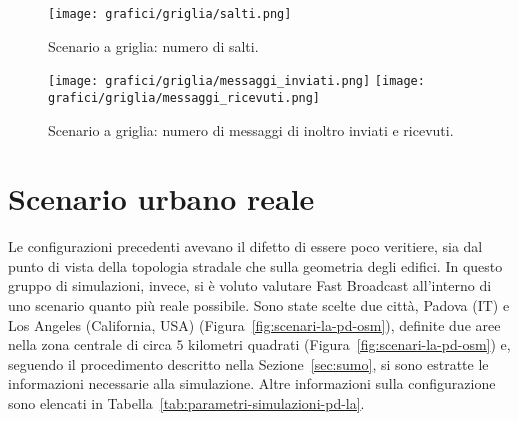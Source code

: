 %
\begin{figure}[htbp]
	\centering
		\texttt{[image: grafici/griglia/salti.png]}
\caption{Scenario a griglia: numero di salti.\label{fig:risultati-griglia-salti}}
\end{figure}
%
\begin{figure}[htbp]
	\centering
		\texttt{[image: grafici/griglia/messaggi\_inviati.png]}
		\texttt{[image: grafici/griglia/messaggi\_ricevuti.png]}
\caption{Scenario a griglia: numero di messaggi di inoltro inviati e ricevuti.\label{fig:risultati-griglia-messaggi}}
\end{figure}
%
%
\section{Scenario urbano reale} %
Le configurazioni precedenti avevano il difetto di essere poco veritiere, sia dal punto di vista della topologia stradale
che sulla geometria degli edifici.
In questo gruppo di simulazioni, invece, si è voluto valutare Fast Broadcast all'interno di uno scenario quanto più reale possibile.
Sono state scelte due città, Padova (IT) e Los Angeles (California, USA) (Figura~\ref{fig:scenari-la-pd-osm}), definite due aree nella zona centrale di circa $5$ kilometri quadrati (Figura~\ref{fig:scenari-la-pd-osm})
e, seguendo il procedimento descritto nella Sezione~\ref{sec:sumo}, si sono estratte le informazioni necessarie alla simulazione.
Altre informazioni sulla configurazione sono elencati in Tabella~\ref{tab:parametri-simulazioni-pd-la}.

